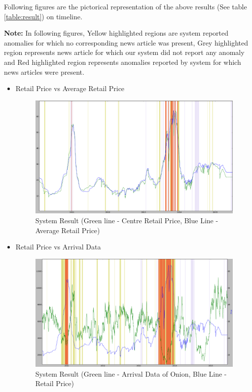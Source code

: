 \documentclass[a4paper,10pt]{article}
\begin{document}
Following figures are the pictorical representation of the above results (See table \ref{table:result}) on timeline.

\textbf{Note:} In following figures, Yellow highlighted regions are system reported anomalies for which no corresponding news article was present, Grey highlighted region represents news article for which our system did not report any anomaly and Red highlighted region represents anomalies reported by system for which news articles were present.

\begin{itemize}
 \item Retail Price vs Average Retail Price
			
			\begin{figure}[H]
		    	\centering
  		    	\includegraphics[width=1.1\textwidth]{graphs/RvsAvg_Whole.png}
		    	\caption{System Result (Green line - Centre Retail Price, Blue Line - Average Retail Price)}
		    	\label{fig:RvsR}
			\end{figure}
			
	
 \item Retail Price vs Arrival Data
			
			\begin{figure}[H]
		    	\centering
  		    	\includegraphics[width=1.1\textwidth]{graphs/RetailVsArrival_whole.png}
		    	\caption{System Result (Green line - Arrival Data of Onion, Blue Line - Retail Price)}
		    	\label{fig:RvsA}
			\end{figure}
			

\end{itemize}
\end{document}

